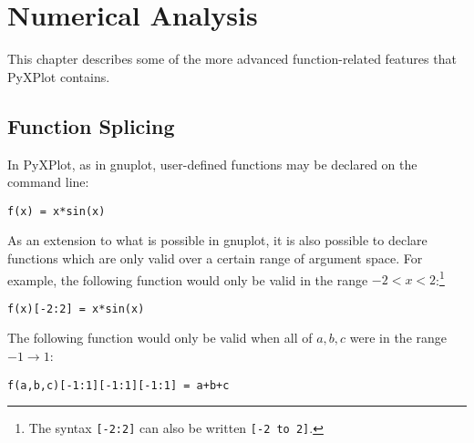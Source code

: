%
%
%
%
%



\chapter{Numerical Analysis}

This chapter describes some of the more advanced function-related features that
PyXPlot contains.

\section{Function Splicing}

In PyXPlot, as in gnuplot, user-defined functions may be declared on the
command line:

\begin{verbatim}
f(x) = x*sin(x)
\end{verbatim}

\noindent As an extension to what is possible in gnuplot, it is also possible
to declare functions which are only valid over a certain range of argument
space. For example, the following function would only be valid in the range
$-2<x<2$:\footnote{The syntax \texttt{[-2:2]} can also be written \texttt{[-2
to 2]}.}

\begin{verbatim}
f(x)[-2:2] = x*sin(x)
\end{verbatim}

\noindent The following function would only be valid when all of ${a,b,c}$ were
in the range $-1 \to 1$:

\begin{verbatim}
f(a,b,c)[-1:1][-1:1][-1:1] = a+b+c
\end{verbatim}

